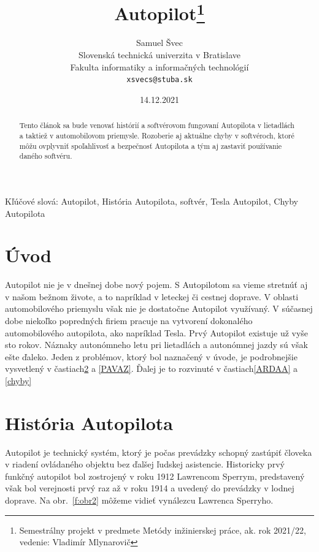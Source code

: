\documentclass[10pt,twoside,slovak,a4paper]{article}
\title{Autopilot\thanks{Semestrálny projekt v predmete Metódy inžinierskej práce, ak. rok 2021/22, vedenie: Vladimír Mlynarovič}} %
\author{Samuel Švec\\[2pt]
	{\small Slovenská technická univerzita v Bratislave}\\
	{\small Fakulta informatiky a informačných technológií}\\
	{\small \texttt{xsvecs@stuba.sk}}
	}
\date{\small 14.12.2021} %
\begin{document}
\maketitle

\begin{abstract}
Tento článok sa bude venovať histórií a softvérovom fungovaní Autopilota v lietadlách a taktiež v automobilovom priemysle. Rozoberie aj aktuálne chyby v softvéroch, ktoré môžu ovplyvniť spoľahlivosť a bezpečnosť Autopilota a tým aj zastaviť používanie daného softvéru.
\end{abstract}

Kľúčové slová: Autopilot, História Autopilota, softvér, Tesla Autopilot, Chyby Autopilota

\section{Úvod}

Autopilot nie je v dnešnej dobe nový pojem. S Autopilotom sa vieme stretnúť aj v našom bežnom živote, a to napríklad v leteckej či cestnej doprave. V oblasti automobilového priemyslu však nie je dostatočne Autopilot využívaný. V súčasnej dobe niekoľko popredných firiem pracuje na vytvorení dokonalého automobilového autopilota, ako napríklad Tesla. Prvý Autopilot existuje už vyše sto rokov. Náznaky autonómneho letu pri lietadlách a autonómnej jazdy sú však ešte ďaleko. Jeden z problémov, ktorý bol naznačený v úvode, je podrobnejšie vysvetlený v častiach\ref{ALD} a \ref{PAVAZ}.
Ďalej je to rozvinuté v častiach\ref{ARDAA} a \ref{chyby} 

\section{História Autopilota} \label{ALD}

Autopilot je technický systém, ktorý je počas prevádzky schopný zastúpiť človeka v riadení ovládaného objektu bez ďalšej ľudskej asistencie. Historicky prvý funkčný autopilot bol zostrojený v roku 1912 Lawrencom Sperrym, predstavený však bol verejnosti prvý raz až v roku 1914 a uvedený do prevádzky v lodnej doprave.\cite{HistoryAutopilot} Na obr.~\ref{f:obr2} môžeme vidieť vynálezcu Lawrenca Sperryho.
\end{document}
